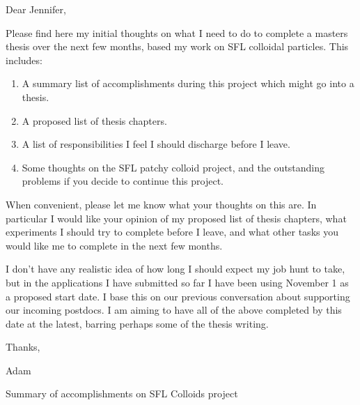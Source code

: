 \documentclass[11pt]{article}
\newcommand{\bigsection}[1]{	
	\vspace{4pt}
	{\fontfamily{phv}\selectfont\Large#1}

}
\begin{document}
\selectfont

\vspace{20pt}

Dear Jennifer,

Please find here my initial thoughts on what I need to do to complete a masters thesis over the next few months, based my work on SFL colloidal particles.
This includes:
\begin{enumerate}
\item A summary list of accomplishments during this project which might go into a thesis.
\item A proposed list of thesis chapters.
\item A list of responsibilities I feel I should discharge before I leave.
\item Some thoughts on the SFL patchy colloid project, and the outstanding problems if you decide to continue this project.
\end{enumerate}

When convenient, please let me know what your thoughts on this are.  In particular I would like your opinion of my proposed list of thesis chapters, 
what experiments I should try to complete before I leave, and what other tasks you would like me to complete in the next few months.

I don't have any realistic idea of how long I should expect my job hunt to take, but in the applications I have submitted so far I have been using November 1 as a proposed start date.
I base this on our previous conversation about supporting our incoming postdocs.  I am aiming to have all of the 
above completed by this date at the latest, barring perhaps some of the thesis writing.

Thanks,


Adam

\pagebreak

\bigsection{Summary of accomplishments on SFL Colloids project}
\end{document}
